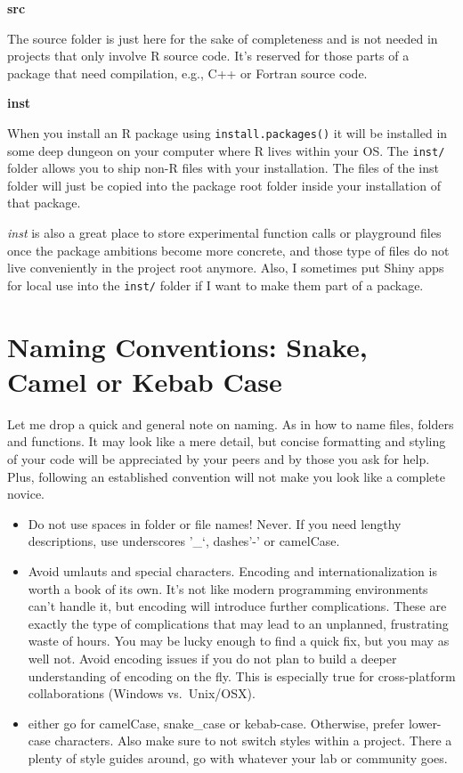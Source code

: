 \documentclass[
  12pt,
  letterpaper,
]{krantz}
\begin{document}
\textbf{src}

The source folder is just here for the sake of completeness and is not
needed in projects that only involve R source code. It's reserved for
those parts of a package that need compilation, e.g., C++ or Fortran
source code.

\textbf{inst}

When you install an R package using \texttt{install.packages()} it will
be installed in some deep dungeon on your computer where R lives within
your OS. The \texttt{inst/} folder allows you to ship non-R files with
your installation. The files of the inst folder will just be copied into
the package root folder inside your installation of that package.

\emph{inst} is also a great place to store experimental function calls
or playground files once the package ambitions become more concrete, and
those type of files do not live conveniently in the project root
anymore. Also, I sometimes put Shiny apps for local use into the
\texttt{inst/} folder if I want to make them part of a package.

\hypertarget{naming-conventions-snake-camel-or-kebab-case}{%
\section{Naming Conventions: Snake, Camel or Kebab
Case}\label{naming-conventions-snake-camel-or-kebab-case}}

Let me drop a quick and general note on naming. As in how to name files,
folders and functions. It may look like a mere detail, but concise
formatting and styling of your code will be appreciated by your peers
and by those you ask for help. Plus, following an established convention
will not make you look like a complete novice.

\begin{itemize}
\item
  Do not use spaces in folder or file names! Never. If you need lengthy
  descriptions, use underscores '\_`, dashes'-' or camelCase.
\item
  Avoid umlauts and special characters. Encoding and
  internationalization is worth a book of its own. It's not like modern
  programming environments can't handle it, but encoding will introduce
  further complications. These are exactly the type of complications
  that may lead to an unplanned, frustrating waste of hours. You may be
  lucky enough to find a quick fix, but you may as well not. Avoid
  encoding issues if you do not plan to build a deeper understanding of
  encoding on the fly. This is especially true for cross-platform
  collaborations (Windows vs.~Unix/OSX).
\item
  either go for camelCase, snake\_case or kebab-case. Otherwise, prefer
  lower-case characters. Also make sure to not switch styles within a
  project. There a plenty of style guides around, go with whatever your
  lab or community goes.
\end{itemize}
\end{document}

